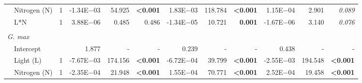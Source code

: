 \begin{landscape}
\begin{table}
{\begin{tabular}{p{0.1cm}p{2.5cm}p{0.5cm}p{1.75cm}p{1.5cm}p{1.5cm}p{1.75cm}p{1.5cm}p{1.5cm}p{1.75cm}p{1.5cm}p{1.5cm}}
         & Nitrogen (N)
         & \multicolumn{1}{r}{1} 
         & \multicolumn{1}{r}{-1.34E$-$03}    & \multicolumn{1}{r}{54.925}    & \multicolumn{1}{r}{\textbf{<0.001}}
         & \multicolumn{1}{r}{1.83E$-$03}     & \multicolumn{1}{r}{118.784}   & \multicolumn{1}{r}{\textbf{<0.001}}
         & \multicolumn{1}{r}{1.15E$-$04}     & \multicolumn{1}{r}{2.901}     & \multicolumn{1}{r}{\textit{0.089}} 
         \\
         
         & L*N
         & \multicolumn{1}{r}{1}            
         & \multicolumn{1}{r}{3.88E$-$06}     & \multicolumn{1}{r}{0.485}     & \multicolumn{1}{r}{0.486}
         & \multicolumn{1}{r}{-1.34E$-$05}    & \multicolumn{1}{r}{10.721}    & \multicolumn{1}{r}{\textbf{0.001}}
         & \multicolumn{1}{r}{-1.67E$-$06}    & \multicolumn{1}{r}{3.140}     & \multicolumn{1}{r}{\textit{0.076}}                 
         \\ 
         &&&&&&&&&& 
         \\ 
         
         \multicolumn{2}{l}{\textit{G. max}} &&&&&&&&&& 
         \\
         & Intercept
         && \multicolumn{1}{r}{1.877}       & \multicolumn{1}{r}{-}         & \multicolumn{1}{r}{-}                     
         & \multicolumn{1}{r}{0.239}        & \multicolumn{1}{r}{-}         & \multicolumn{1}{r}{-}  
         & \multicolumn{1}{r}{0.438}        & \multicolumn{1}{r}{-}         & \multicolumn{1}{r}{-} 
         \\
         
         & Light (L)
         & \multicolumn{1}{r}{1}
         & \multicolumn{1}{r}{-7.67E$-$03}    & \multicolumn{1}{r}{174.156}   & \multicolumn{1}{r}{\textbf{<0.001}}      
         & \multicolumn{1}{r}{-6.72E$-$04}    & \multicolumn{1}{r}{39.799}    & \multicolumn{1}{r}{\textbf{<0.001}}
         & \multicolumn{1}{r}{-2.55E$-$03}    & \multicolumn{1}{r}{194.548}   & \multicolumn{1}{r}{\textbf{<0.001}} 
         \\
         
         & Nitrogen (N)
         & \multicolumn{1}{r}{1} 
         & \multicolumn{1}{r}{-2.35E$-$04}    & \multicolumn{1}{r}{21.948}    & \multicolumn{1}{r}{\textbf{<0.001}}
         & \multicolumn{1}{r}{1.55E$-$04}     & \multicolumn{1}{r}{70.771}    & \multicolumn{1}{r}{\textbf{<0.001}}
         & \multicolumn{1}{r}{2.52E$-$04}     & \multicolumn{1}{r}{19.458}    & \multicolumn{1}{r}{\textbf{<0.001}} 
         \\
         

\end{tabular}}
\end{table}
\end{landscape}

